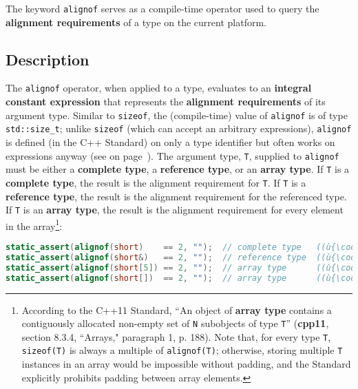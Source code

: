 

The keyword \texttt{alignof} serves as a compile-time operator used to
query the \textbf{alignment requirements} of a type on the current
platform.

\subsection[Description]{Description}\label{description}

The \texttt{alignof} operator, when applied to a type, evaluates to an
\textbf{integral constant expression} that represents the
\textbf{alignment requirements} of its argument type. Similar to
\texttt{sizeof}, the (compile-time) value of \texttt{alignof} is of type
\texttt{std::size\_t}; unlike \texttt{sizeof} (which can accept an
arbitrary expressions), \texttt{alignof} is defined (in the C++
Standard) on only a type identifier but often works on expressions
anyway (see \textit{} on page~\pageref{annoyances-alignof}). The argument type,
\texttt{T}, supplied to \texttt{alignof} must be either a
\textbf{complete type}, a \textbf{reference type}, or an \textbf{array
type}. If \texttt{T} is a \textbf{complete type}, the result is the
alignment requirement for \texttt{T}. If \texttt{T} is a
\textbf{reference type}, the result is the alignment requirement for the
referenced type. If \texttt{T} is an \textbf{array type}, the
result is the alignment requirement for every element in the array{\cprotect\footnote{According to the C++11 Standard, ``An object of \textbf{array type} contains a contiguously allocated
  non-empty set of \texttt{N} subobjects of type \texttt{T}''  (\textbf{cpp11}, section 8.3.4, ``Arrays," paragraph 1, p. 188). Note
  that, for every type \texttt{T}, \texttt{sizeof(T)} is always a
  multiple of \texttt{alignof(T)}; otherwise, storing multiple \texttt{T} instances in an array would be impossible without padding,
  and the Standard explicitly prohibits padding between array elements.}}:

\begin{lstlisting}[language=C++]
static_assert(alignof(short)    == 2, "");  // complete type   ((ù{\codeincomments{sizeof}}ù) is 2)
static_assert(alignof(short&)   == 2, "");  // reference type  ((ù{\codeincomments{sizeof}}ù) is 2)
static_assert(alignof(short[5]) == 2, "");  // array type      ((ù{\codeincomments{sizeof}}ù) is 2)
static_assert(alignof(short[])  == 2, "");  // array type      ((ù{\codeincomments{sizeof}}ù) fails)
\end{lstlisting}
    

